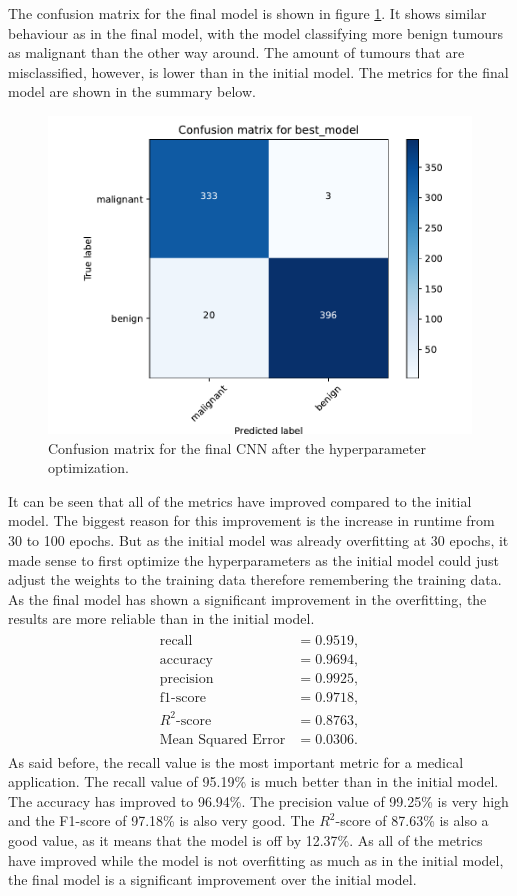 The confusion matrix for the final model is shown in figure \ref{fig:confusionMatrixFinal}.
It shows similar behaviour as in the final model, with the model classifying more benign tumours as malignant than the other way around.
The amount of tumours that are misclassified, however, is lower than in the initial model.
The metrics for the final model are shown in the summary below.
\begin{figure}
    \centering
    \includegraphics[width=.48\textwidth]{plots/confusion_matrix_best_model.pdf}
    \caption{Confusion matrix for the final CNN after the hyperparameter optimization.}
    \label{fig:confusionMatrixFinal}
\end{figure}
\noindent
It can be seen that all of the metrics have improved compared to the initial model.
The biggest reason for this improvement is the increase in runtime from 30 to 100 epochs.
But as the initial model was already overfitting at 30 epochs, it made sense to first optimize the hyperparameters as the initial model could just adjust the weights to the training data therefore remembering the training data.
As the final model has shown a significant improvement in the overfitting, the results are more reliable than in the initial model. \newline
\begin{align}
    \label{eq:metricsFinalCNN}
    \begin{split}
        \text{recall} &= 0.9519, \\
        \text{accuracy} &= 0.9694, \\
        \text{precision} &= 0.9925, \\
        \text{f1-score} &= 0.9718, \\
        R^2\text{-score} &= 0.8763, \\
        \text{Mean Squared Error} &= 0.0306.
    \end{split}
\end{align}
As said before, the recall value is the most important metric for a medical application.
The recall value of 95.19\% is much better than in the initial model.
The accuracy has improved to 96.94\%. 
The precision value of 99.25\% is very high and the F1-score of 97.18\% is also very good.
The $R^2$-score of 87.63\% is also a good value, as it means that the model is off by 12.37\%. \newline
As all of the metrics have improved while the model is not overfitting as much as in the initial model, the final model is a significant improvement over the initial model.
